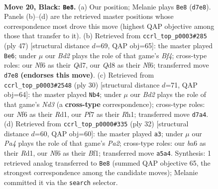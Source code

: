 \documentclass[11pt]{article}
\begin{document}
\clearpage

\begin{figure}[p]\centering
\begin{subfigure}{0.46\textwidth}\centering
\resizebox{\linewidth}{!}{%
\newchessgame
\chessboard[
  setfen={rr1q2k1/p2b1ppp/B4n2/p2p4/7P/1P1Q1NP1/P4P2/R3R1K1 b - - 1 20},
  showmover=false,
  pgfstyle=straightmove, color=movearrow, markmove={d7-e8}
]}
\caption{}
\end{subfigure}\hfill
\begin{subfigure}{0.46\textwidth}\centering
\resizebox{\linewidth}{!}{%
\newchessgame
\chessboard[
  setfen={1r2r1k1/3q1pp1/3p1n1p/1p3b2/1P6/2N3P1/3QPPBP/2R1R1K1 b - - 2 24},
  showmover=false,
  pgfstyle=straightmove, color=movearrow, markmove={f5-e6}
]}
\caption{}
\end{subfigure}
\\[4pt]
\begin{subfigure}{0.46\textwidth}\centering
\resizebox{\linewidth}{!}{%
\newchessgame
\chessboard[
  setfen={r3k2r/ppp4p/2npp3/3q4/3b1B1P/3N4/PPPQ2P1/2KR3R w kq - 0 16},
  showmover=false,
  pgfstyle=straightmove, color=movearrow, markmove={d3-b4}
]}
\caption{}
\end{subfigure}\hfill
\begin{subfigure}{0.46\textwidth}\centering
\resizebox{\linewidth}{!}{%
\newchessgame
\chessboard[
  setfen={2kr3r/pp1b2p1/1q1ppp2/7n/4P2P/2N5/PPPQ1P2/2KR1BR1 w - - 2 17},
  showmover=false,
  pgfstyle=straightmove, color=movearrow, markmove={a2-a3}
]}
\caption{}
\end{subfigure}
\caption{\textbf{Move 20, Black: \texttt{Be8}.} (a) Our position; Melanie plays \texttt{Be8} (\texttt{d7e8}). Panels (b)--(d) are the retrieved master positions whose correspondence most drove this move (highest QAP objective among those that transfer to it). (b) Retrieved from \texttt{ccrl\_top\_p0003\#285} (ply 47) [structural distance $d$=69, QAP obj=65]: the master played \texttt{Be6}; under $\mu$ our \emph{Bd2} plays the role of that game's \emph{Bf4}; cross-type roles: our \emph{N}f6 as their \emph{Q}d7, our \emph{Q}d8 as their \emph{N}f6; transferred move \texttt{d7e8} \textbf{(endorses this move)}. (c) Retrieved from \texttt{ccrl\_top\_p0003\#2548} (ply 30) [structural distance $d$=71, QAP obj=64]: the master played \texttt{Nb4}; under $\mu$ our \emph{Bd2} plays the role of that game's \emph{Nd3} (a \textbf{cross-type} correspondence); cross-type roles: our \emph{N}f6 as their \emph{R}d1, our \emph{P}f7 as their \emph{R}h1; transferred move \texttt{d7a4}. (d) Retrieved from \texttt{ccrl\_top\_p0000\#335} (ply 32) [structural distance $d$=60, QAP obj=60]: the master played \texttt{a3}; under $\mu$ our \emph{Pa4} plays the role of that game's \emph{Pa2}; cross-type roles: our \emph{b}a6 as their \emph{R}d1, our \emph{N}f6 as their \emph{B}f1; transferred move \texttt{a5a4}. Synthesis: 1 retrieved analog transferred to \texttt{Be8} (summed QAP objective 65, the strongest correspondence among the candidate moves); Melanie committed it via the \texttt{search} selector.}
\label{fig:thought-m39}
\end{figure}
\end{document}
